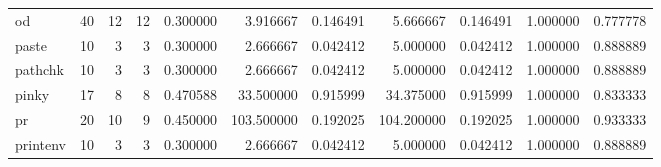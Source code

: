 \begin{tabular}{lrrrrrrrrrr}
od        &                                      40 &                 12 &                                12 &                                   0.300000 &                               3.916667 &                                     0.146491 &                          5.666667 &                                0.146491 &                           1.000000 &                                           0.777778 \\
paste     &                                      10 &                  3 &                                 3 &                                   0.300000 &                               2.666667 &                                     0.042412 &                          5.000000 &                                0.042412 &                           1.000000 &                                           0.888889 \\
pathchk   &                                      10 &                  3 &                                 3 &                                   0.300000 &                               2.666667 &                                     0.042412 &                          5.000000 &                                0.042412 &                           1.000000 &                                           0.888889 \\
pinky     &                                      17 &                  8 &                                 8 &                                   0.470588 &                              33.500000 &                                     0.915999 &                         34.375000 &                                0.915999 &                           1.000000 &                                           0.833333 \\
pr        &                                      20 &                 10 &                                 9 &                                   0.450000 &                             103.500000 &                                     0.192025 &                        104.200000 &                                0.192025 &                           1.000000 &                                           0.933333 \\
printenv  &                                      10 &                  3 &                                 3 &                                   0.300000 &                               2.666667 &                                     0.042412 &                          5.000000 &                                0.042412 &                           1.000000 &                                           0.888889 \\

\end{tabular}
